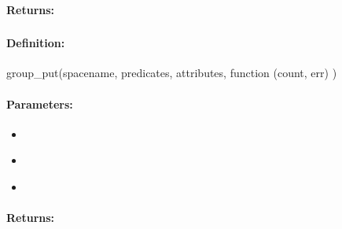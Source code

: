 \paragraph{Returns:}


\pagebreak
\subsubsection{}
\label{api:nodejs:group_put}


\paragraph{Definition:}
\begin{javascriptcode}
group_put(spacename, predicates, attributes, function (count, err) {})
\end{javascriptcode}
\paragraph{Parameters:}
\begin{itemize}[noitemsep]
\item {}\\

\item {}\\

\item {}\\

\end{itemize}

\paragraph{Returns:}


\pagebreak
\subsubsection{}
\label{api:nodejs:put_if_not_exist}



